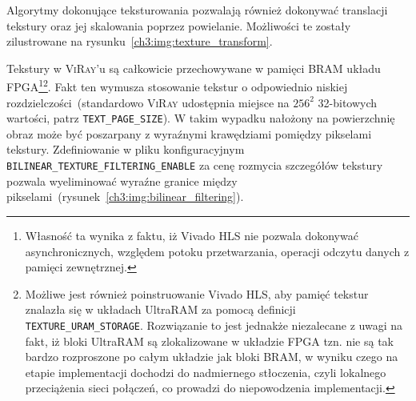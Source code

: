 \begin{enumerate}
\begin{itemize}
\end{itemize}

Algorytmy dokonujące teksturowania pozwalają również dokonywać translacji tekstury oraz jej skalowania poprzez powielanie. Możliwości te zostały zilustrowane na rysunku~\ref{ch3:img:texture_transform}.


Tekstury w \textsc{ViRay}'u są całkowicie przechowywane w pamięci BRAM układu FPGA\footnote{Własność ta wynika z faktu, iż Vivado HLS nie pozwala dokonywać asynchronicznych, względem potoku przetwarzania, operacji odczytu danych z pamięci zewnętrznej.}\footnote{Możliwe jest również poinstruowanie Vivado HLS, aby pamięć tekstur znalazła się w układach UltraRAM za pomocą definicji \texttt{TEXTURE\_URAM\_STORAGE}. Rozwiązanie to jest jednakże niezalecane z uwagi na fakt, iż bloki UltraRAM są zlokalizowane w układzie FPGA tzn. nie są tak bardzo rozproszone po całym układzie jak bloki BRAM, w wyniku czego na etapie implementacji dochodzi do nadmiernego stłoczenia, czyli lokalnego przeciążenia sieci połączeń, co prowadzi do niepowodzenia implementacji.}. Fakt ten wymusza stosowanie tekstur o odpowiednio niskiej rozdzielczości~(standardowo \textsc{ViRay} udostępnia miejsce na $256^2$ 32-bitowych wartości, patrz \texttt{TEXT\_PAGE\_SIZE}). W takim wypadku nałożony na powierzchnię obraz może być poszarpany z wyraźnymi krawędziami pomiędzy pikselami tekstury. Zdefiniowanie w pliku konfiguracyjnym \texttt{BILINEAR\_TEXTURE\_FILTERING\_ENABLE} za cenę rozmycia szczegółów tekstury pozwala wyeliminować wyraźne granice między pikselami~(rysunek~\ref{ch3:img:bilinear_filtering}). 



\end{enumerate}
